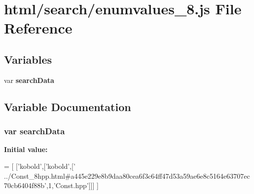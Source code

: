\section{html/search/enumvalues\-\_\-8.js File Reference}
\label{enumvalues__8_8js}
\subsection*{Variables}
\begin{DoxyCompactItemize}
\item 
var {\bf search\-Data}
\end{DoxyCompactItemize}


\subsection{Variable Documentation}
\subsubsection[{search\-Data}]{\setlength{\rightskip}{0pt plus 5cm}var search\-Data}\label{enumvalues__8_8js_ad01a7523f103d6242ef9b0451861231e}
{\bfseries Initial value\-:}
\begin{DoxyCode}
=
[
  [\textcolor{stringliteral}{'kobold'},[\textcolor{stringliteral}{'kobold'},[\textcolor{stringliteral}{'
      ../Const\_8hpp.html#a445e229e8b9daa80cea6f3c64ff47d53a59ae6e8c5164e63707ec70cb6404f88b'},1,\textcolor{stringliteral}{'Const.hpp'}]]]
]
\end{DoxyCode}
